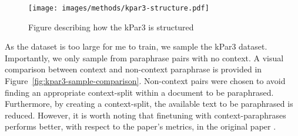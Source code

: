 \documentclass{l4proj}
\theoremstyle{definition}
\begin{document}
        \begin{figure}[ht]
            \centering
            \texttt{[image: images/methods/kpar3-structure.pdf]}
            \caption{Figure describing how the kPar3 is structured}
            \label{fig:kpar3-structure}
        \end{figure}
        
        As the dataset is too large for me to train, we sample the kPar3 dataset. Importantly, we only sample from paraphrase pairs with no context. A visual comparison between context and non-context paraphrase is provided in Figure~\ref{fig:kpar3-sample-comparison}. Non-context pairs were chosen to avoid finding an appropriate context-split within a document to be paraphrased. Furthermore, by creating a context-split, the available text to be paraphrased is reduced. However, it is worth noting that finetuning with context-paraphrases performs better, with respect to the paper's metrics, in the original paper \citep{krishna2023paraphrasing}.
            
\end{document}
